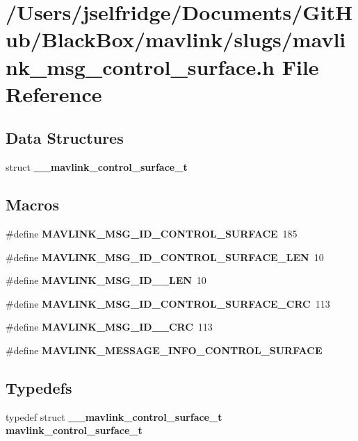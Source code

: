 \section{/\+Users/jselfridge/\+Documents/\+Git\+Hub/\+Black\+Box/mavlink/slugs/mavlink\+\_\+msg\+\_\+control\+\_\+surface.h File Reference}
\label{mavlink__msg__control__surface_8h}
\subsection*{Data Structures}
\begin{DoxyCompactItemize}
\item 
struct \textbf{ \+\_\+\+\_\+mavlink\+\_\+control\+\_\+surface\+\_\+t}
\end{DoxyCompactItemize}
\subsection*{Macros}
\begin{DoxyCompactItemize}
\item 
\#define \textbf{ M\+A\+V\+L\+I\+N\+K\+\_\+\+M\+S\+G\+\_\+\+I\+D\+\_\+\+C\+O\+N\+T\+R\+O\+L\+\_\+\+S\+U\+R\+F\+A\+CE}~185
\item 
\#define \textbf{ M\+A\+V\+L\+I\+N\+K\+\_\+\+M\+S\+G\+\_\+\+I\+D\+\_\+\+C\+O\+N\+T\+R\+O\+L\+\_\+\+S\+U\+R\+F\+A\+C\+E\+\_\+\+L\+EN}~10
\item 
\#define \textbf{ M\+A\+V\+L\+I\+N\+K\+\_\+\+M\+S\+G\+\_\+\+I\+D\+\_\+\_\+\+L\+EN}~10
\item 
\#define \textbf{ M\+A\+V\+L\+I\+N\+K\+\_\+\+M\+S\+G\+\_\+\+I\+D\+\_\+\+C\+O\+N\+T\+R\+O\+L\+\_\+\+S\+U\+R\+F\+A\+C\+E\+\_\+\+C\+RC}~113
\item 
\#define \textbf{ M\+A\+V\+L\+I\+N\+K\+\_\+\+M\+S\+G\+\_\+\+I\+D\+\_\+\_\+\+C\+RC}~113
\item 
\#define \textbf{ M\+A\+V\+L\+I\+N\+K\+\_\+\+M\+E\+S\+S\+A\+G\+E\+\_\+\+I\+N\+F\+O\+\_\+\+C\+O\+N\+T\+R\+O\+L\+\_\+\+S\+U\+R\+F\+A\+CE}
\end{DoxyCompactItemize}
\subsection*{Typedefs}
\begin{DoxyCompactItemize}
\item 
typedef struct \textbf{ \+\_\+\+\_\+mavlink\+\_\+control\+\_\+surface\+\_\+t} \textbf{ mavlink\+\_\+control\+\_\+surface\+\_\+t}
\end{DoxyCompactItemize}


